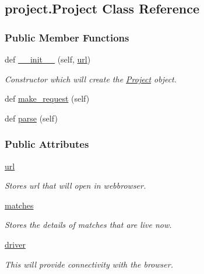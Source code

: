 \hypertarget{classproject_1_1Project}{}\subsection{project.\+Project Class Reference}
\label{classproject_1_1Project}
\subsubsection*{Public Member Functions}
\begin{DoxyCompactItemize}
\item 
def \hyperlink{classproject_1_1Project_a704727c31e05086eb487df5709f3dc11}{\+\_\+\+\_\+init\+\_\+\+\_\+} (self, \hyperlink{classproject_1_1Project_a01795b2bb34021c1beccf62211d1383b}{url})
\begin{DoxyCompactList}\small\item\em Constructor which will create the \hyperlink{classproject_1_1Project}{Project} object. \end{DoxyCompactList}\item 
def \hyperlink{classproject_1_1Project_a6a082d685dd38ddf6431e1a8062d64ab}{make\+\_\+request} (self)
\item 
def \hyperlink{classproject_1_1Project_a8b0632dc91022b3127cbd76da7e5420c}{parse} (self)
\end{DoxyCompactItemize}
\subsubsection*{Public Attributes}
\begin{DoxyCompactItemize}
\item 
\hyperlink{classproject_1_1Project_a01795b2bb34021c1beccf62211d1383b}{url}
\begin{DoxyCompactList}\small\item\em Stores url that will open in webbrowser. \end{DoxyCompactList}\item 
\hyperlink{classproject_1_1Project_a18aa35e3a410570e67d7241c2a59e3ea}{matches}
\begin{DoxyCompactList}\small\item\em Stores the details of matches that are live now. \end{DoxyCompactList}\item 
\hyperlink{classproject_1_1Project_a1445a6c709827f6c88b5cf755341fb28}{driver}
\begin{DoxyCompactList}\small\item\em This will provide connectivity with the browser. \end{DoxyCompactList}\end{DoxyCompactItemize}


